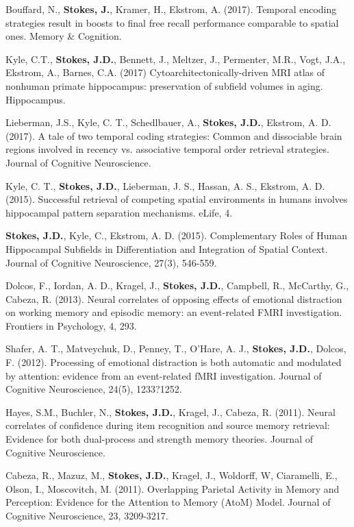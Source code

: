 \documentclass[line,margin,10pt]{res}
\begin{document}
\begin{resume}
Bouffard, N., \textbf{Stokes, J.}, Kramer, H., Ekstrom, A. (2017). Temporal encoding strategies result in boosts to final free recall performance comparable to spatial ones. Memory \& Cognition.

Kyle, C.T., \textbf{Stokes, J.D.}, Bennett, J., Meltzer, J., Permenter, M.R., Vogt, J.A., Ekstrom, A., Barnes, C.A. (2017) Cytoarchitectonically-driven MRI atlas of nonhuman primate hippocampus:  preservation of subfield volumes in aging. Hippocampus. 

Lieberman, J.S., Kyle, C. T., Schedlbauer, A., \textbf{Stokes, J.D.}, Ekstrom, A. D. (2017). A tale of two temporal coding strategies: Common and dissociable brain regions involved in recency vs. associative temporal order retrieval strategies. Journal of Cognitive Neuroscience.

Kyle, C. T., \textbf{Stokes, J.D.}, Lieberman, J. S., Hassan, A. S., Ekstrom, A. D. (2015). Successful retrieval of competing spatial environments in humans involves hippocampal pattern separation mechanisms. eLife, 4. 

\textbf{Stokes, J.D.}, Kyle, C., Ekstrom, A. D. (2015). Complementary Roles of Human Hippocampal Subfields in Differentiation and Integration of Spatial Context. Journal of Cognitive Neuroscience, 27(3), 546-559. 

Dolcos, F., Iordan, A. D., Kragel, J., \textbf{Stokes, J.D.}, Campbell, R., McCarthy, G., Cabeza, R. (2013). Neural correlates of opposing effects of emotional distraction on working memory and episodic memory: an event-related FMRI investigation. Frontiers in Psychology, 4, 293. 

Shafer, A. T., Matveychuk, D., Penney, T., O'Hare, A. J., \textbf{Stokes, J.D.}, Dolcos, F. (2012). Processing of emotional distraction is both automatic and modulated by attention: evidence from an event-related fMRI investigation. Journal of Cognitive Neuroscience, 24(5), 1233?1252.
 		
Hayes, S.M., Buchler, N., \textbf{Stokes, J.D.}, Kragel, J., Cabeza, R. (2011). Neural correlates of confidence during item recognition and source memory retrieval: Evidence for both dual-process and strength memory theories. Journal of Cognitive Neuroscience.
	
Cabeza, R., Mazuz, M., \textbf{Stokes, J.D.}, Kragel, J., Woldorff, W, Ciaramelli, E., Olson, I., Moscovitch, M. (2011). Overlapping Parietal Activity in Memory and Perception: Evidence for the Attention to Memory (AtoM) Model. Journal of Cognitive Neuroscience, 23, 3209-3217.
	

\end{resume}
\end{document}
